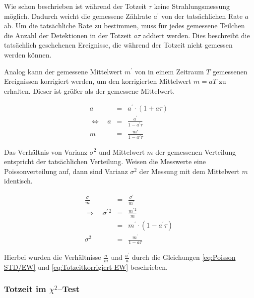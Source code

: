 \documentclass[12pt,a4paper]{scrartcl}
\numberwithin{equation}{section} %
\begin{document}
Wie schon beschrieben ist während der Totzeit $\tau$ keine Strahlungsmessung möglich. Dadurch weicht die gemessene Zählrate $a^\prime$ von der tatsächlichen Rate $a$ ab. Um die tatsächliche Rate zu bestimmen, muss für jedes gemessene Teilchen die Anzahl der Detektionen in der Totzeit $a\tau$ addiert werden. Dies beschreibt die tatsächlich geschehenen Ereignisse, die während der Totzeit nicht gemessen werden können.

Analog kann der gemessene Mittelwert $m^\prime$ von in einem Zeitraum $T$ gemessenen Ereignissen korrigiert werden, um den korrigierten Mittelwert $m=aT$ zu erhalten. Dieser ist größer als der gemessene Mittelwert.

\begin{eqnarray}
	a &=& a^\prime \cdot(1 + a\tau) \\
	\Leftrightarrow\quad a &=& \frac{a^\prime}{1-a^\prime\tau} \label{eq:Totzeitkorrigiert Rate}\\
	m &=&\frac{m'}{1-a'\tau} \label{eq:Totzeitkorrigiert EW}
\end{eqnarray}

\noindent
Das Verhältnis von Varianz $\sigma^2$ und Mittelwert $m$ der gemessenen Verteilung entspricht der tatsächlichen Verteilung. Weisen die Messwerte eine Poissonverteilung auf, dann sind Varianz $\sigma^2$ der Messung mit dem Mittelwert $m$ identisch.

\begin{eqnarray}
	\frac{\sigma}{m}&=&\frac{\sigma^\prime}{m^\prime}\\
	\Rightarrow\quad \sigma^{\prime\,2} & = &\frac{m^{\prime\,2}}{m} \\
		&=& m^\prime\cdot(1-a^\prime\tau) \\
	\sigma^2
		&=& \frac{m^\prime}{1-a\tau}
\end{eqnarray}

\noindent
Hierbei wurden die Verhältnisse $\frac{\sigma}{m}$ und $\frac{a^\prime}{a}$ durch die Gleichungen \eqref{eq:Poisson STD/EW} und \eqref{eq:Totzeitkorrigiert EW} beschrieben.

\hypertarget{einfluss-der-totzeit}{%
\subsubsection{Totzeit im $\chi^2$--Test}\label{einfluss-der-totzeit}}
\end{document}
